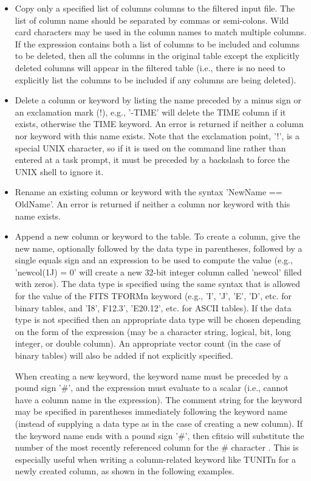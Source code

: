 \documentclass[11pt]{book}
\begin{document}
\begin{itemize}

\item
Copy only a specified list of columns columns to the filtered input file.
The list of column name should be separated by commas or semi-colons.  Wild card
characters may be used in the column names to match multiple columns.
If the expression contains both a list of columns to be included and
columns to be deleted, then all the columns in the original table
except the explicitly deleted columns will appear in the filtered
table (i.e., there is no need to explicitly list the columns to
be included if any columns are being deleted).

\item
Delete a column or keyword by listing the name preceded by a minus sign
or an exclamation mark (!), e.g., '-TIME' will delete the TIME column
if it exists, otherwise the TIME keyword.  An error is returned if
neither a column nor keyword with this name exists.  Note  that the
exclamation point,  '!', is a special UNIX character, so if it is used
on the command line rather than entered at a task prompt, it must be
preceded by a backslash to force the UNIX shell to ignore it.

\item
Rename an existing column or keyword with the syntax 'NewName ==
OldName'.  An error is returned if neither a column nor keyword with
this name exists.

\item
Append a new column or keyword to the table.  To create a column,
give the new name, optionally followed by the data type in parentheses,
followed by a single equals sign and an  expression to be used to
compute the value (e.g., 'newcol(1J) = 0' will create a new 32-bit
integer column called 'newcol' filled with zeros).  The data type is
specified using the same syntax that is allowed for the value of the
FITS TFORMn keyword (e.g., 'I', 'J', 'E', 'D', etc. for binary tables,
and 'I8', F12.3', 'E20.12', etc. for ASCII tables).  If the data type is
not specified then an appropriate data type will be chosen depending on
the form of the expression (may be a character string, logical, bit, long
integer, or double column). An appropriate vector count (in the case
of binary tables) will also be added if not explicitly specified.

When creating a new keyword, the keyword name must be preceded by a
pound sign '\#', and the expression must evaluate to a scalar
(i.e., cannot have a column name in the expression).  The comment
string for the keyword may be specified in parentheses immediately
following the keyword name (instead of supplying a data type as in
the case of creating a new column).  If the keyword name ends with a
pound sign '\#', then cfitsio will substitute the number of the
most recently referenced column for the \# character .
This is especially useful when writing
a column-related keyword like TUNITn for a newly created column,
as shown in the following examples.


\end{itemize}
\end{document}
